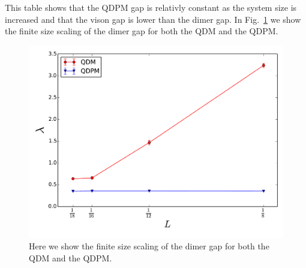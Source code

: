 \documentclass[twocolumn,prb,aps,floatfix,superscriptaddress]{revtex4-1}
\begin{document}
    This table shows that the QDPM gap is relativly constant as the system size is increased and
    that the vison gap is lower than the dimer gap. In Fig.~\ref{fig:qdm_qdpm_gap} we show the
    finite size scaling of the dimer gap for both the QDM and the QDPM.
    \begin{figure}[htpb]
        \centering
        \includegraphics[width=0.8\linewidth]{qdm_vs_qdpm_dmr_gap.pdf}
        \caption{Here we show the finite size scaling of the dimer gap for both the QDM and the
        QDPM.}
        \label{fig:qdm_qdpm_gap}
    \end{figure}


%
%
\end{document}
